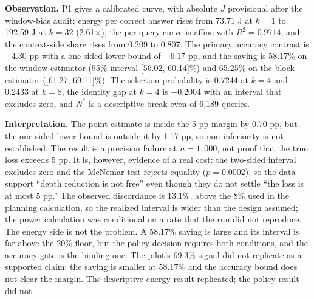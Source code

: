 \documentclass[a4paper,fleqn]{cas-sc}
\begin{document}
\textbf{Observation.} P1 gives a calibrated curve, with absolute $J$ provisional after the window-bias audit: energy per correct answer rises from 73.71 J at $k=1$ to 192.59 J at $k=32$ (2.61$\times$), the per-query curve is affine with $R^{2}=0.9714$, and the context-side share rises from 0.209 to 0.807. The primary accuracy contrast is $-4.30$ pp with a one-sided lower bound of $-6.17$ pp, and the saving is 58.17\% on the window estimator (95\% interval [56.02, 60.14]\%) and 65.25\% on the block estimator ([61.27, 69.11]\%). The selection probability is 0.7244 at $k=4$ and 0.2433 at $k=8$, the identity gap at $k=4$ is $+0.2004$ with an interval that excludes zero, and $N^{*}$ is a descriptive break-even of 6{,}189 queries.

\textbf{Interpretation.} The point estimate is inside the 5 pp margin by 0.70 pp, but the one-sided lower bound is outside it by 1.17 pp, so non-inferiority is not established. The result is a precision failure at $n=1{,}000$, not proof that the true loss exceeds 5 pp. It is, however, evidence of a real cost: the two-sided interval excludes zero and the McNemar test rejects equality ($p=0.0002$), so the data support “depth reduction is not free” even though they do not settle “the loss is at most 5 pp.” The observed discordance is 13.1\%, above the 8\% used in the planning calculation, so the realized interval is wider than the design assumed; the power calculation was conditional on a rate that the run did not reproduce. The energy side is not the problem. A 58.17\% saving is large and its interval is far above the 20\% floor, but the policy decision requires both conditions, and the accuracy gate is the binding one. The pilot's 69.3\% signal did not replicate as a supported claim: the saving is smaller at 58.17\% and the accuracy bound does not clear the margin. The descriptive energy result replicated; the policy result did not.
\end{document}
